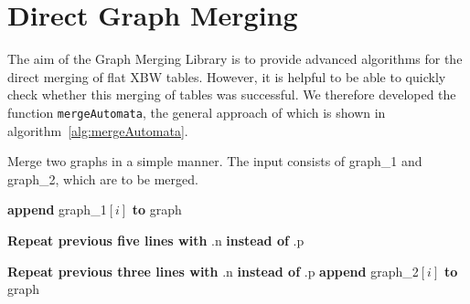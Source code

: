 \documentclass[a4paper,12pt,twoside,BCOR=10mm]{scrbook}
\begin{document}
\section{Direct Graph Merging}
\label{sec:direct_graph_merging}

The aim of the Graph Merging Library is to provide advanced algorithms
for the direct merging of flat XBW tables.
However, it is helpful to be able to quickly check whether this merging of tables
was successful.
We therefore developed the function \texttt{mergeAutomata},
the general approach of which is shown in algorithm~\ref{alg:mergeAutomata}.
\begin{algorithm}
\caption[Merge two graphs]{Merge two graphs in a simple manner. The input consists of graph\_1 and graph\_2, which are to be merged.}
\label{alg:mergeAutomata}
\begin{algorithmic}[1]


\State \phantom{nl}

	\Else
		\State \textbf{append} graph\_1$[ i ]$ \textbf{to} graph
	\EndIf
\EndFor

\State \phantom{nl}

\EndFor

\State \phantom{nl}

		\EndIf
	\EndFor
	\State \textbf{Repeat previous five lines with} .n \textbf{instead of} .p
\EndFor

\State \phantom{nl}

	\EndFor
	\State \textbf{Repeat previous three lines with} .n \textbf{instead of} .p
	\State \textbf{append} graph\_2$[ i ]$ \textbf{to} graph
\EndFor


\end{algorithmic}
\end{algorithm}
\end{document}
